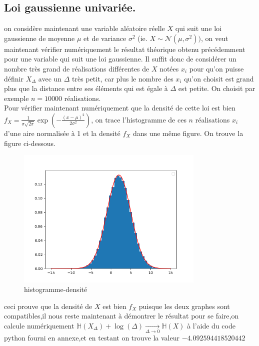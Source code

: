 \documentclass[a4paper]{article}
\begin{document}
\subsection{Loi gaussienne univariée.}
on considère maintenant une variable aléatoire réelle $X$ qui suit une loi gaussienne de moyenne $\mu$ et de variance $\sigma^{2}$ (ie. $X \sim \mathcal{N}(\mu, \sigma^{2}))$, on veut maintenant vérifier numériquement le résultat théorique obtenu précédemment pour une variable qui suit une loi gaussienne. Il suffit donc de considérer un nombre très grand de réalisations différentes de $X$ notées $x_i$ pour qu'on puisse définir $X_{\Delta}$ avec un $\Delta$ très petit, car plus le nombre des $x_i$ qu'on choisit est grand plus que la distance entre ses éléments qui est égale à $\Delta$ est petite. On choisit par exemple $n=10000$ réalisations.\\
Pour vérifier maintenant numériquement que la densité de cette loi est bien $f_{X}=\frac{1}{\sigma\sqrt{2\pi}}\exp\left(-\frac{(x-\mu)^{2}}{2\sigma^2}\right)$, on trace l'histogramme de ces $n$ réalisations $x_{i}$ d'une aire normalisée à 1 et la densité $f_{X}$ dans une même figure. On trouve la figure ci-dessous.

\begin{figure}[h]
  \centering
  \includegraphics[width=0.8\textwidth]{Figure_1.png}
  \caption{histogramme-densité}
\end{figure}
ceci prouve que la densité de $X$ est bien $f_X$ puisque les deux graphes sont compatibles,il nous reste maintenant à démontrer le résultat
pour se faire,on calcule numériquement $\mathbb{H}(X_\Delta)+\log(\Delta)\underset{\Delta \rightarrow 0}{\rightarrow}\mathbb{H}(X)$ à l'aide du code python fourni en annexe,et en testant on trouve la valeur $-4.092594418520442$
\newpage
\end{document}
